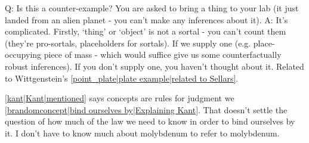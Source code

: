 Q: Is this a counter-example? You are asked to bring a thing to your lab (it just landed from an alien planet - you can't make any inferences about it).
A: It's complicated. Firstly, `thing' or `object' is not a sortal - you can't count them (they're pro-sortals, placeholders for sortals). If we supply one (e.g. place-occupying piece of mass - which would suffice give us some counterfactually robust inferences). If you don't supply one, you haven't thought about it. Related to Wittgenstein's \ref{point_plate|plate example|related to Sellars}.

\ref{kant|Kant|mentioned} says concepts are rules for judgment we \ref{brandomconcept|bind ourselves by|Explaining Kant}. That doesn't settle the question of how much of the law we need to know in order to bind ourselves by it. I don't have to know much about molybdenum to refer to molybdenum.



